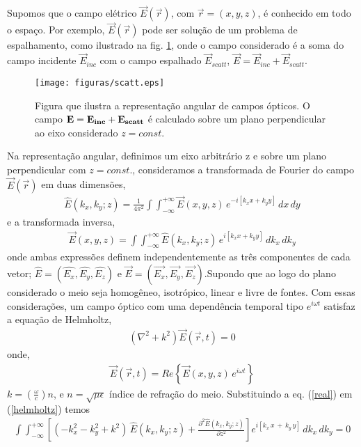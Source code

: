 Supomos que o campo elétrico $\vec{E}(\vec{r})$, com $\vec{r}=(x,y,z)$, é conhecido em todo o espaço. Por exemplo, $\vec{E}(\vec{r})$ pode ser solução de um problema de espalhamento, como ilustrado na fig. \ref{fig:scatt}, onde o campo considerado é a soma do campo incidente $\vec{E}_{inc}$ com o campo espalhado $\vec{E}_{scatt}$, $\vec{E}=\vec{E}_{inc}+\vec{E}_{scatt}$.

\begin{figure}[h]
\centering
\texttt{[image: figuras/scatt.eps]}
\caption{Figura que ilustra a representação angular de campos ópticos. O campo $\bf E=E_{inc}+E_{scatt}$ é calculado sobre um plano perpendicular ao eixo considerado $z=const.$ \cite{principle}}
\label{fig:scatt}
\end{figure} 
Na representação angular, definimos um eixo arbitrário z e sobre um plano perpendicular com $z=const.$, consideramos a transformada de Fourier do campo $\vec{E}(\vec{r})$ em duas dimensões,
\begin{eqnarray}
\widehat{E}(k_x,k_y;z)=\frac{1}{4\pi^2}\int\int_{-\infty}^{+\infty}\vec{E}(x,y,z)\,e^{-i[k_x x + k_y y]}\,dx\, dy
\label{transf} 
\end{eqnarray}
e a transformada inversa,
\begin{eqnarray}
\vec{E}(x,y,z)=\int\int_{-\infty}^{+\infty}\widehat{E}(k_x,k_y;z)\,e^{i[k_x x + k_y y]}\,dk_x\, dk_y
\label{transfinversa} 
\end{eqnarray}
onde ambas expressões definem independentemente as três componentes de cada vetor; $\widehat{E}=(\widehat{E_x},\widehat{E_y},\widehat{E_z})$ e $\vec{E}=(\vec{E_x},\vec{E_y},\vec{E_z})$.Supondo que ao logo do plano considerado o meio seja homogêneo, isotrópico, linear e livre de fontes. Com essas considerações, um campo óptico com uma dependência temporal tipo $e^{i\omega t}$ satisfaz a equação de Helmholtz,
\begin{eqnarray}
(\nabla^2+k^2)\vec{E}(\vec{r},t)=0
\label{helmholtz}
\end{eqnarray} 
onde,
\begin{eqnarray}
\vec{E}(\vec{r},t)=Re\left\{\vec{E}(x,y,z)\,e^{i\omega t}\right\}
\label{real}
\end{eqnarray}
$k=(\frac{\omega}{c})n$, e $n=\sqrt{\mu\epsilon}$ índice de refração do meio. Substituindo a eq. (\ref{real}) em (\ref{helmholtz}) temos
\begin{eqnarray}
\int\int_{-\infty}^{+\infty}\left[(-k_x^2-k_y^2+k^2)\,\widehat{E}(k_x,k_y;z)+\frac{\partial^2\widehat{E}(k_x,k_y;z)}{\partial z^2} \right] e^{i[k_x\,x\,+\,k_y\,y]} \, dk_x \, dk_y = 0
\label{inthelmholtz}
\end{eqnarray}
